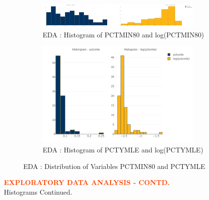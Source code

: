 \begin{figure}[!ht]
	\begin{subfigure}[b]{1.0\textwidth}
		\centering
		\includegraphics[width=0.9\textwidth,height=0.30\textheight]{images/EDA_histograms_pctmin80.jpg}
		\caption{EDA : Histogram of PCTMIN80 and log(PCTMIN80)}
		\label{fig:EDA Histogram PCTMIN80}
	\end{subfigure}\vspace{3mm}%
	
	\begin{subfigure}[b]{1.0\textwidth}
		\centering
		\includegraphics[width=0.9\textwidth,height=0.30\textheight]{images/EDA_histograms_pctymle.jpg}
		\caption{EDA : Histogram of PCTYMLE and log(PCTYMLE)}
		\label{fig:EDA Histogram PCTYMLE}
	\end{subfigure}
	\label{fig:PCTMIN80 and PCTYMLE Histogram}
	\caption{EDA : Distribution of Variables PCTMIN80 and PCTYMLE}
\end{figure}

\pagebreak

\textbf{\textcolor{OrangeRed}{EXPLORATORY DATA ANALYSIS - CONTD.}}\\

Histograms Continued.\\

